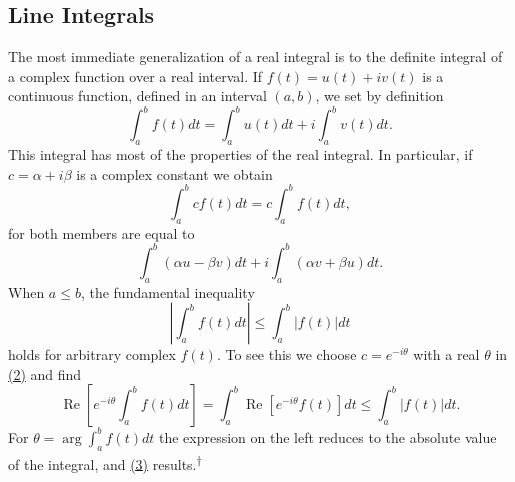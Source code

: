 \setcounter{section}{1}\setcounter{subsection}{0}\subsection{Line Integrals}\label{sec:4.1.1}
The most immediate generalization of a real integral is to the definite integral of a complex function over a real interval. If $f(t) = u(t) + iv(t)$ is a continuous function,
\begingroup\renewcommand{\thefootnote}{}\endgroup
defined in an interval $(a,b)$, we set by definition
\begin{equation*}
\int_ {a} ^ {b} f (t) d t = \int_ {a} ^ {b} u (t) d t + i \int_ {a} ^ {b} v (t) d t.\tag{1}\label{eq:4.1}
\end{equation*}
This integral has most of the properties of the real integral. In particular, if $c = \alpha + i\beta$ is a complex constant we obtain
\begin{equation*}
\int_ {a} ^ {b} c f (t) d t = c \int_ {a} ^ {b} f (t) d t,\tag{2}\label{eq:4.2}
\end{equation*}
for both members are equal to
\begin{equation*}
\int_ {a} ^ {b} (\alpha u - \beta v) d t + i \int_ {a} ^ {b} (\alpha v + \beta u) d t.
\end{equation*}
When $a \leq b$, the fundamental inequality
\begin{equation*}
\left| \int_ {a} ^ {b} f (t) d t \right| \leq \int_ {a} ^ {b} | f (t) | d t\tag{3}\label{eq:4.3}
\end{equation*}
holds for arbitrary complex $f(t)$. To see this we choose $c = e^{-i\theta}$ with a real $\theta$ in \hyperref[eq:4.2]{(2)} and find
\begin{equation*}
\operatorname{Re} \left[ e ^ {- i \theta} \int_ {a} ^ {b} f (t) d t \right] = \int_ {a} ^ {b} \operatorname{Re} \left[ e ^ {- i \theta} f (t) \right] d t \leq \int_ {a} ^ {b} | f (t) | d t.
\end{equation*}
For $\theta = \arg \int_{a}^{b} f(t) dt$ the expression on the left reduces to the absolute value of the integral, and \hyperref[eq:4.3]{(3)} results.\hyperlink{fn:118:dagger}{\textsuperscript{\ensuremath{\dagger}}}

